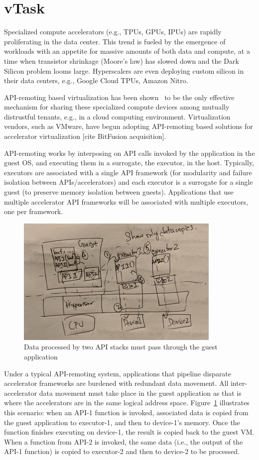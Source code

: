 \section{vTask}
\label{sec:vTask}

Specialized compute accelerators (e.g., TPUs, GPUs, IPUs) are rapidly proliferating in the data center. This trend is fueled by the emergence of workloads with an appetite for massive amounts of both data and compute, at a time when transistor shrinkage (Moore’s law) has slowed down and the Dark Silicon problem looms large. Hyperscalers are even deploying custom silicon in their data centers, e.g., Google Cloud TPUs, Amazon Nitro.

API-remoting based virtualization has been shown~\cite{trillium,ava-hotos}
to be the only effective mechanism for sharing these specialized compute devices among mutually distrustful tenants, e.g., in a cloud computing environment. Virtualization vendors, such as VMware, have begun adopting API-remoting based solutions for accelerator virtualization [cite BitFusion acquisition].

API-remoting works by interposing on API calls invoked by the application in the guest OS, and executing them in a surrogate, the executor, in the host. Typically, executors are associated with a single API framework (for modularity and failure isolation between APIs/accelerators) and each executor is a surrogate for a single guest (to preserve memory isolation between guests). Applications that use multiple accelerator API frameworks will be associated with multiple executors, one per framework.

\begin{figure}[ht!]
\centering
\captionsetup{justification=centering,width=\linewidth}
\includegraphics[width=0.5\linewidth]{figures/overview.png}
\caption{Data processed by two API stacks must pass through the guest application}
\label{fig:overview}
\end{figure}

Under a typical API-remoting system, applications that pipeline disparate accelerator frameworks are burdened with redundant data movement. All inter-accelerator data movement must take place in the guest application as that is where the accelerators are in the same logical address space. Figure~\ref{fig:overview} illustrates this scenario: when an API-1 function is invoked, associated data is copied from the guest application to executor-1, and then to device-1’s memory. Once the function finishes executing on device-1, the result is copied back to the guest VM. When a function from API-2 is invoked, the same data (i.e., the output of the API-1 function) is copied to executor-2 and then to device-2 to be processed.

